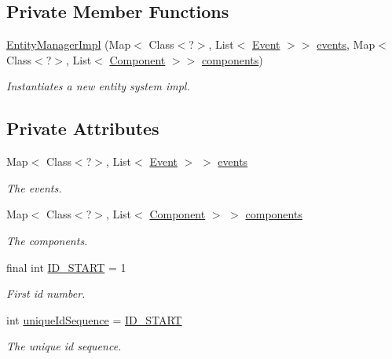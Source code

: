 \subsection*{Private Member Functions}
\begin{DoxyCompactItemize}
\item 
\hyperlink{classbr_1_1unb_1_1unbomber_1_1core_1_1_entity_manager_impl_a7edd67f31e530f7be3c237ae2039ab0b}{Entity\+Manager\+Impl} (Map$<$ Class$<$?$>$, List$<$ \hyperlink{classbr_1_1unb_1_1unbomber_1_1core_1_1_event}{Event} $>$$>$ \hyperlink{classbr_1_1unb_1_1unbomber_1_1core_1_1_entity_manager_impl_abc12602c37518ce23d253360215b077f}{events}, Map$<$ Class$<$?$>$, List$<$ \hyperlink{classbr_1_1unb_1_1unbomber_1_1core_1_1_component}{Component} $>$$>$ \hyperlink{classbr_1_1unb_1_1unbomber_1_1core_1_1_entity_manager_impl_aeb1f73aabc5b9a3b2e4728cc5105152c}{components})
\begin{DoxyCompactList}\small\item\em Instantiates a new entity system impl. \end{DoxyCompactList}\end{DoxyCompactItemize}
\subsection*{Private Attributes}
\begin{DoxyCompactItemize}
\item 
Map$<$ Class$<$?$>$, List$<$ \hyperlink{classbr_1_1unb_1_1unbomber_1_1core_1_1_event}{Event} $>$ $>$ \hyperlink{classbr_1_1unb_1_1unbomber_1_1core_1_1_entity_manager_impl_abc12602c37518ce23d253360215b077f}{events}
\begin{DoxyCompactList}\small\item\em The events. \end{DoxyCompactList}\item 
Map$<$ Class$<$?$>$, List$<$ \hyperlink{classbr_1_1unb_1_1unbomber_1_1core_1_1_component}{Component} $>$ $>$ \hyperlink{classbr_1_1unb_1_1unbomber_1_1core_1_1_entity_manager_impl_aeb1f73aabc5b9a3b2e4728cc5105152c}{components}
\begin{DoxyCompactList}\small\item\em The components. \end{DoxyCompactList}\item 
final int \hyperlink{classbr_1_1unb_1_1unbomber_1_1core_1_1_entity_manager_impl_aa31f25455e28eaa6be62c4f7133bc96f}{I\+D\+\_\+\+S\+T\+A\+R\+T} = 1
\begin{DoxyCompactList}\small\item\em First id number. \end{DoxyCompactList}\item 
int \hyperlink{classbr_1_1unb_1_1unbomber_1_1core_1_1_entity_manager_impl_a68e7d8adbdf22a16de5f28264c6312a8}{unique\+Id\+Sequence} = \hyperlink{classbr_1_1unb_1_1unbomber_1_1core_1_1_entity_manager_impl_aa31f25455e28eaa6be62c4f7133bc96f}{I\+D\+\_\+\+S\+T\+A\+R\+T}
\begin{DoxyCompactList}\small\item\em The unique id sequence. \end{DoxyCompactList}\end{DoxyCompactItemize}
